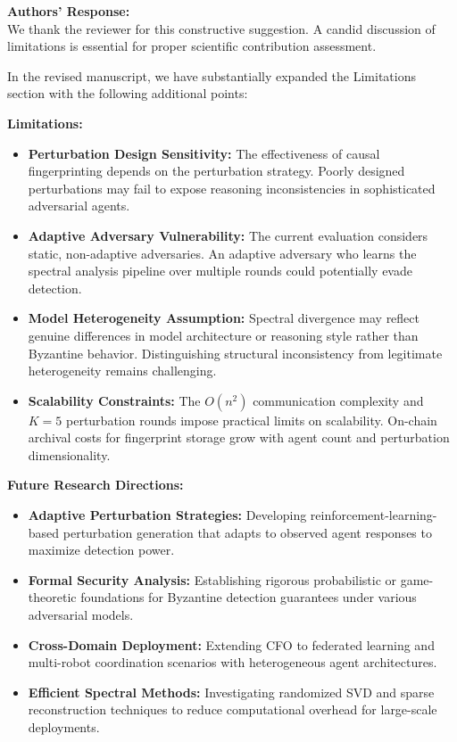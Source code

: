 \documentclass[11pt,a4paper]{article}
\newcommand{\response}[1]{%
  \noindent\textbf{\textcolor{responsecolor}{Authors' Response:}}\\
  #1\vspace{8pt}}
\begin{document}
\response{We thank the reviewer for this constructive suggestion. A candid discussion of limitations is essential for proper scientific contribution assessment.

In the revised manuscript, we have substantially expanded the Limitations section with the following additional points:

\textbf{Limitations:}
\begin{itemize}[nosep]
\item \textbf{Perturbation Design Sensitivity:} The effectiveness of causal fingerprinting depends on the perturbation strategy. Poorly designed perturbations may fail to expose reasoning inconsistencies in sophisticated adversarial agents.
\item \textbf{Adaptive Adversary Vulnerability:} The current evaluation considers static, non-adaptive adversaries. An adaptive adversary who learns the spectral analysis pipeline over multiple rounds could potentially evade detection.
\item \textbf{Model Heterogeneity Assumption:} Spectral divergence may reflect genuine differences in model architecture or reasoning style rather than Byzantine behavior. Distinguishing structural inconsistency from legitimate heterogeneity remains challenging.
\item \textbf{Scalability Constraints:} The $O(n^2)$ communication complexity and $K=5$ perturbation rounds impose practical limits on scalability. On-chain archival costs for fingerprint storage grow with agent count and perturbation dimensionality.
\end{itemize}

\textbf{Future Research Directions:}
\begin{itemize}[nosep]
\item \textbf{Adaptive Perturbation Strategies:} Developing reinforcement-learning-based perturbation generation that adapts to observed agent responses to maximize detection power.
\item \textbf{Formal Security Analysis:} Establishing rigorous probabilistic or game-theoretic foundations for Byzantine detection guarantees under various adversarial models.
\item \textbf{Cross-Domain Deployment:} Extending CFO to federated learning and multi-robot coordination scenarios with heterogeneous agent architectures.
\item \textbf{Efficient Spectral Methods:} Investigating randomized SVD and sparse reconstruction techniques to reduce computational overhead for large-scale deployments.
\end{itemize}}
\end{document}
